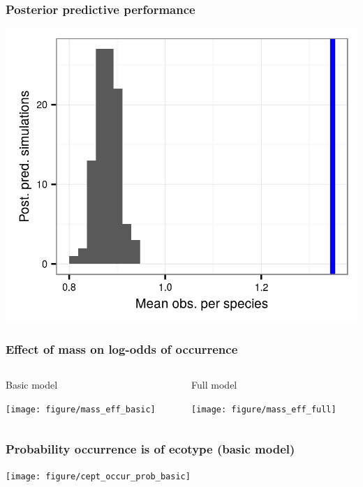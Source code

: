 \documentclass{beamer}
\begin{document}
\begin{frame}
  \frametitle{Posterior predictive performance}

  \begin{center}
    \includegraphics[height=\textheight,width=\textwidth,keepaspectratio=true]{figure/pred_occ}
  \end{center}
\end{frame}


\begin{frame}
  \frametitle{Effect of mass on log-odds of occurrence}

  \begin{columns}
    \begin{column}{0.5\textwidth}
      Basic model
      \vspace*{0.05\textheight}

      \texttt{[image: figure/mass\_eff\_basic]}
    \end{column}
    \begin{column}{0.5\textwidth}
      Full model
      \vspace*{0.05\textheight}

      \texttt{[image: figure/mass\_eff\_full]}
    \end{column}
  \end{columns}
\end{frame}


\begin{frame}
  \frametitle{Probability occurrence is of ecotype (basic model)}

  \begin{center}
    \texttt{[image: figure/cept\_occur\_prob\_basic]}
  \end{center}
\end{frame}
\end{document}
